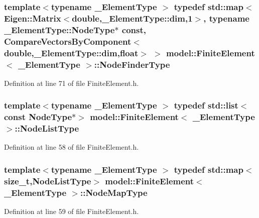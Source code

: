 \subsubsection[{Node\+Finder\+Type}]{\setlength{\rightskip}{0pt plus 5cm}template$<$typename \+\_\+\+Element\+Type $>$ typedef std\+::map$<$Eigen\+::\+Matrix$<$double,{\bf \+\_\+\+Element\+Type\+::dim},1$>$, typename {\bf \+\_\+\+Element\+Type\+::\+Node\+Type}$\ast$ const, {\bf Compare\+Vectors\+By\+Component}$<$double,{\bf \+\_\+\+Element\+Type\+::dim},float$>$ $>$ {\bf model\+::\+Finite\+Element}$<$ \+\_\+\+Element\+Type $>$\+::{\bf Node\+Finder\+Type}}\label{classmodel_1_1_finite_element_ac8d169f08fe81612ccb6373ea8ce0902}


Definition at line 71 of file Finite\+Element.\+h.

\hypertarget{classmodel_1_1_finite_element_a7af9e72b3b309eacc0a939b164a67e0e}{}
\subsubsection[{Node\+List\+Type}]{\setlength{\rightskip}{0pt plus 5cm}template$<$typename \+\_\+\+Element\+Type $>$ typedef std\+::list$<$const {\bf Node\+Type}$\ast$$>$ {\bf model\+::\+Finite\+Element}$<$ \+\_\+\+Element\+Type $>$\+::{\bf Node\+List\+Type}}\label{classmodel_1_1_finite_element_a7af9e72b3b309eacc0a939b164a67e0e}


Definition at line 58 of file Finite\+Element.\+h.

\hypertarget{classmodel_1_1_finite_element_a7dc7180abea8b4d87babf0b62dac1ebb}{}
\subsubsection[{Node\+Map\+Type}]{\setlength{\rightskip}{0pt plus 5cm}template$<$typename \+\_\+\+Element\+Type $>$ typedef std\+::map$<$size\+\_\+t,{\bf Node\+List\+Type}$>$ {\bf model\+::\+Finite\+Element}$<$ \+\_\+\+Element\+Type $>$\+::{\bf Node\+Map\+Type}}\label{classmodel_1_1_finite_element_a7dc7180abea8b4d87babf0b62dac1ebb}


Definition at line 59 of file Finite\+Element.\+h.

